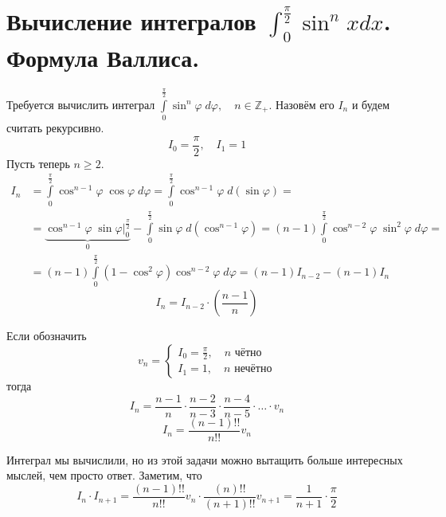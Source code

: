 \documentclass[../main.tex]{subfiles}
\begin{document}
\newpage
\section{Вычисление интегралов \( \int_{ 0}^{ \frac{ \pi}{ 2}} \sin^n xdx\). Формула Валлиса.}
Требуется вычислить интеграл \( \displaystyle\int\limits_{ 0}^{ \frac{ \pi}{ 2}} \sin^n \varphi \;d \varphi ,\quad n \in \mathbb{Z}_+\). Назовём его \( I_n\) и будем считать рекурсивно. 
\[ I_0= \dfrac{ \pi}{ 2} ,\quad I_1=1\]
Пусть теперь \( n \geq 2\).
\begin{equation*}
    \begin{aligned}
        I_n&= \displaystyle\int\limits_{ 0}^{ \frac{ \pi}{ 2}  } \cos ^{n-1} \varphi \; \cos \varphi \; d \varphi = \displaystyle\int\limits_{ 0}^{ \frac{ \pi}{ 2}  } \cos ^{n-1} \varphi \; d\left( \sin \varphi \right)=\\
        &=\underbrace{\cos^{n-1} \varphi \; \sin \varphi \bigg|_0^{ \frac{ \pi}{ 2}}}_0 - \displaystyle\int\limits_{ 0}^{ \frac{ \pi}{ 2}  } \sin \varphi \; d\left( \cos ^{n-1} \varphi \right)=\left( n-1\right) \displaystyle\int\limits_{ 0}^{ \frac{ \pi}{ 2}  } \cos ^{n-2} \varphi \; \sin^2 \varphi \;d \varphi =\\ 
        &=\left( n-1\right) \displaystyle\int\limits_{ 0}^{ \frac{ \pi}{ 2}  } \left( 1- \cos^2 \varphi \right)\cos^{n-2} \varphi \; d \varphi = \left( n-1\right) I_{n-2} - \left( n-1\right)I_n
    \end{aligned}
\end{equation*}
\[ \boxed{I_n= I_{n-2} \cdot \left( \dfrac{ n-1}{ n} \right)}\]

Если обозначить
\begin{equation*}
    v_n=
    \begin{cases}
        I_0= \frac{ \pi}{ 2},\quad n\text{ чётно}\\ 
        I_1=1,\quad n\text{ нечётно} 
    \end{cases}
\end{equation*}
тогда 
\[ I_n= \dfrac{ n-1}{ n} \cdot \dfrac{ n-2}{ n-3} \cdot \dfrac{ n-4}{ n-5} \cdot \ldots \cdot v_n\]
\[ \boxed{I_n= \dfrac{ \left(n-1\right)!!}{ n!!} v_n}\]

Интеграл мы вычислили, но из этой задачи можно вытащить больше интересных мыслей, чем просто ответ. Заметим, что
\[ I_n \cdot I_{n+1}= \dfrac{ \left(n-1\right)!!}{ n!!} v_n \cdot \dfrac{ \left(n\right)!!}{ \left( n+1\right)!!} v_{n+1} =  \dfrac{ 1}{ n+1} \cdot  \dfrac{ \pi}{ 2}  \]
\end{document}
